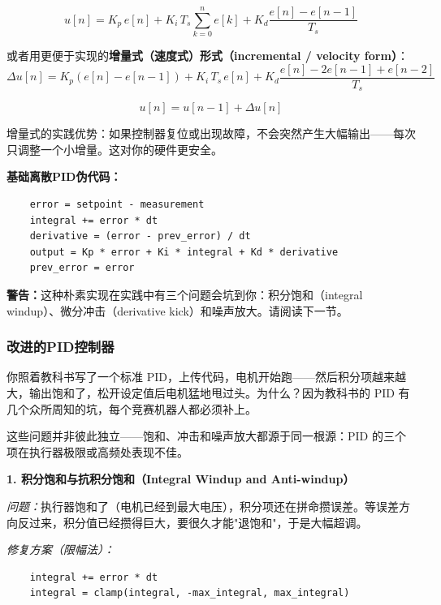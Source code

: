 \begin{equation}
u[n] = K_p \, e[n] + K_i \, T_s \sum_{k=0}^{n} e[k] + K_d \frac{e[n] - e[n-1]}{T_s}
\end{equation}

或者用更便于实现的\textbf{增量式（速度式）形式（incremental / velocity form）}：
\begin{equation}
\Delta u[n] = K_p (e[n] - e[n-1]) + K_i \, T_s \, e[n] + K_d \frac{e[n] - 2e[n-1] + e[n-2]}{T_s}
\end{equation}

\begin{equation}
u[n] = u[n-1] + \Delta u[n]
\end{equation}

增量式的实践优势：如果控制器复位或出现故障，不会突然产生大幅输出——每次只调整一个小增量。这对你的硬件更安全。

\textbf{基础离散PID伪代码：}
\begin{verbatim}
    error = setpoint - measurement
    integral += error * dt
    derivative = (error - prev_error) / dt
    output = Kp * error + Ki * integral + Kd * derivative
    prev_error = error
\end{verbatim}

\textbf{警告：}这种朴素实现在实践中有三个问题会坑到你：积分饱和（integral windup）、微分冲击（derivative kick）和噪声放大。请阅读下一节。

\subsubsection{改进的PID控制器}

你照着教科书写了一个标准 PID，上传代码，电机开始跑——然后积分项越来越大，输出饱和了，松开设定值后电机猛地甩过头。为什么？因为教科书的 PID 有几个众所周知的坑，每个竞赛机器人都必须补上。

这些问题并非彼此独立——饱和、冲击和噪声放大都源于同一根源：PID 的三个项在执行器极限或高频处表现不佳。

\textbf{1. 积分饱和与抗积分饱和（Integral Windup and Anti-windup）}

\textit{问题：}执行器饱和了（电机已经到最大电压），积分项还在拼命攒误差。等误差方向反过来，积分值已经攒得巨大，要很久才能"退饱和"，于是大幅超调。

\textit{修复方案（限幅法）：}
\begin{verbatim}
    integral += error * dt
    integral = clamp(integral, -max_integral, max_integral)
\end{verbatim}

